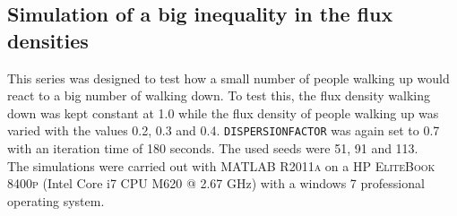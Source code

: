 \subsection{Simulation of a big inequality in the flux densities}
This series was designed to test how a small number of people walking up would react to a big number of walking down. To test this, the flux density walking down was kept constant at 1.0 while the flux density of people walking up was varied with the values 0.2, 0.3 and 0.4. \texttt{DISPERSIONFACTOR} was again set to 0.7 with an iteration time of 180 seconds. The used seeds were 51, 91 and 113.\\

\noi The simulations were carried out with \textsc{MATLAB R2011a} on a \textsc{HP EliteBook 8400p} (Intel Core i7 CPU M620 @ 2.67 GHz) with a windows 7 professional operating system.

